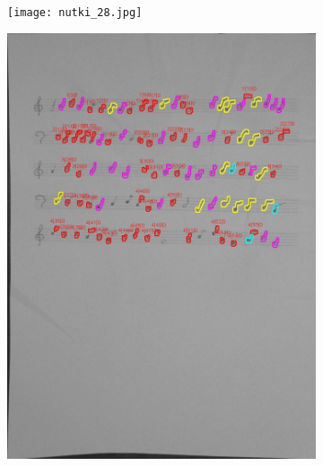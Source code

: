 \documentclass[11pt]{article}
\begin{document}
\begin{figure}[H]
    \centering
    \begin{subfigure}{.5\textwidth}
        \centering
        \graphicspath{ {Resources/} }
        \texttt{[image: nutki\_28.jpg]}
        \label{fig:sub1}
    \end{subfigure}%
    \begin{subfigure}{.5\textwidth}
        \centering
        \graphicspath{ {blobs/} }
        \includegraphics[width=\linewidth]{28_cnts.jpg}
        \label{fig:sub2}
    \end{subfigure}
    \label{fig:test}
\end{figure}
\end{document}
